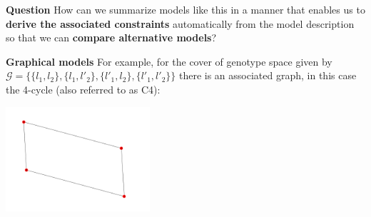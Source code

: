 \begin{frame}
\begin{block}{\textbf{Question}}
How can we summarize models like this in a manner that enables us to \textbf{derive the associated constraints} automatically from the model description so that we can \textbf{compare alternative models}?
\end{block}
\begin{block}{\textbf{Graphical models}}
For example, for the cover of genotype space given by
$\mathcal{G} = \{\{l_1,l_2 \},\{l_1,l'_2 \},\{l'_1,l_2\},\{l'_1,l'_2\} \}$
there is an associated graph, in this case the 4-cycle (also referred to as C4):
\begin{center}
\includegraphics[width=0.4\textwidth]{fig/C4graph.pdf}
\end{center}
\end{block}
\end{frame}
